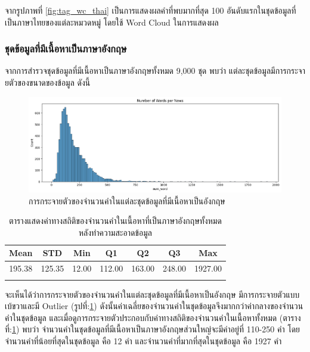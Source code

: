 \documentclass[12pt,oneside,openright,a4paper]{cpe-thai-project}
\begin{document}
\begin{itemize}
        \hspace{1cm}จากรูปภาพที่ \ref{fig:tag_wc_thai} เป็นการแสดงผลคำที่พบมากที่สุด 100 อันดับแรกในชุดข้อมูลที่เป็นภาษาไทยของแต่ละหมวดหมู่ โดยใช้ Word Cloud ในการแสดงผล
        \newpage

      \subsubsection{ชุดข้อมูลที่มีเนื้อหาเป็นภาษาอังกฤษ}
        \hspace{1cm}จากการสำรวจชุดข้อมูลที่มีเนื้อหาเป็นภาษาอังกฤษทั้งหมด 9,000 ชุด พบว่า แต่ละชุดข้อมูลมีการกระจายตัวของขนาดของข้อมูล \newline ดังนี้
        \begin{figure}[!ht]\centering
          \includegraphics[width=\textwidth]{./img/eng_stat/hist_all_word.png}
          \caption{การกระจายตัวของจำนวนคำในแต่ละชุดข้อมูลที่มีเนื้อหาเป็นอังกฤษ}\label{fig:eng_hist}
        \end{figure}
        \begin{longtable}[!ht]{ccccccc}
          \caption{ตารางแสดงค่าทางสถิติของจำนวนคำในเนื้อหาที่เป็นภาษาอังกฤษทั้งหมดหลังทําความสะอาดข้อมูล}
          \label{tbl:eng_stat_all}\\
          \hhline{=======}
          \textbf{Mean} & \textbf{STD} & \textbf{Min} & \textbf{Q1} & \textbf{Q2} & \textbf{Q3} & \textbf{Max}\\ \hline
          \endhead
          195.38 & 125.35 & 12.00 & 112.00 & 163.00 & 248.00 & 1927.00  \\ \hhline{=======}
        \end{longtable}
        \hspace{1cm}จะเห็นได้ว่าการกระจายตัวของจำนวนคำในแต่ละชุดข้อมูลที่มีเนื้อหาเป็นอังกฤษ มีการกระจายตัวแบบเบ้ขวาและมี Outlier (รูปที่:\ref{fig:eng_hist}) 
        ดังนั้นค่าเฉลี่ยของจำนวนคำในชุดข้อมูลจึงมากกว่าค่ากลางของจำนวนคำในชุดข้อมูล และเมื่อดูการกระจายตัวประกอบกับค่าทางสถิติของจำนวนคำในเนื้อหาทั้งหมด
        (ตารางที่:\ref{tbl:eng_stat_all}) พบว่า จำนวนคำในชุดข้อมูลที่มีเนื้อหาเป็นภาษาอังกฤษส่วนใหญ่จะมีค่าอยู่ที่ 110-250 คำ โดยจำนวนคำที่น้อยที่สุดในชุดข้อมูล คือ 12 คำ
        และจำนวนคำที่มากที่สุดในชุดข้อมูล คือ 1927 คำ


\end{itemize}
\end{document}
